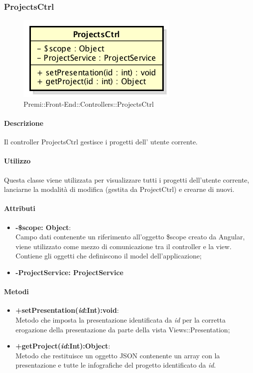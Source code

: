 \newpage
\subsubsection{ProjectsCtrl}
\begin{figure}[h]
	\centering
	\includegraphics[width=0.4\linewidth]{img/premi_front_end_controllers_projectsctrl}
	\caption[Premi::Front-End::Controllers::ProjectsCtrl]{Premi::Front-End::Controllers::ProjectsCtrl}
\end{figure}
	\paragraph{Descrizione}
	Il controller ProjectsCtrl gestisce i progetti dell' utente corrente.
	
	\paragraph{Utilizzo}
	Questa classe viene utilizzata per visualizzare tutti i progetti dell'utente corrente, lanciarne la modalità di modifica (gestita da ProjectCtrl) e crearne di nuovi.\\
	\paragraph{Attributi}
	\begin{itemize}
		\item \textbf{-\$scope: Object}:\\
			Campo dati contenente un riferimento all'oggetto \$scope creato da Angular, viene utilizzato come mezzo di comunicazione tra il controller e la view. Contiene gli oggetti che definiscono il model dell'applicazione;
		\item \textbf{-ProjectService: ProjectService}
	\end{itemize}
	
	\paragraph{Metodi}
	\begin{itemize}
	  \item \textbf{+setPresentation(\textit{id}:Int):void}:\\
		  Metodo che imposta la presentazione identificata da  \textit{id} per la corretta erogazione della presentazione da parte della vista Views::Presentation;
	  \item \textbf{+getProject(\textit{id}:Int):Object}:\\
		  Metodo che restituisce un oggetto JSON contenente un array con la presentazione e tutte le infografiche del progetto identificato da \textit{id}.
		  
	\end{itemize}
